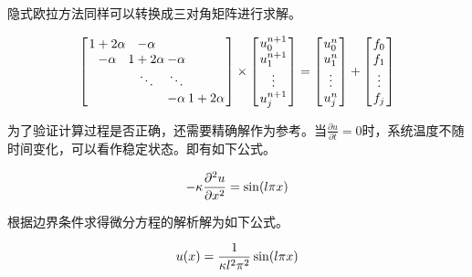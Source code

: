 \documentclass[final]{cvpr}
\begin{document}
隐式欧拉方法同样可以转换成三对角矩阵进行求解。
\begin{center}
	\begin{scriptsize}
		\begin{equation}
			\setlength{\arraycolsep}{1pt}
			\setlength{\abovedisplayskip}{-5pt}
\left[\begin{array}{cccc}
	1+2 \alpha & -\alpha & &  \\
	-\alpha & 1+2 \alpha & -\alpha &  \\
	& \ddots & \ddots & \\
	&  & -\alpha & 1+2\alpha
\end{array}\right] \times\left[\begin{array}{c}
	u_{0}^{n+1} \\
	u_{1}^{n+1} \\
	\vdots \\
	u_{j}^{n+1}
\end{array}\right]=\left[\begin{array}{c}
	u_{0}^{n} \\
	u_{1}^{n} \\
	\vdots \\
	u_{j}^{n}
\end{array}\right]+\left[\begin{array}{c}
	f_{0} \\
	f_{1} \\
	\vdots \\
	f_{j}
\end{array}\right]
		\end{equation}
	\end{scriptsize}
\end{center}

为了验证计算过程是否正确，还需要精确解作为参考。当$\frac{\partial u}{\partial t}=0$时，系统温度不随时间变化，可以看作稳定状态。即有如下公式。
\begin{center}
	\begin{scriptsize}
		\begin{equation}
			\setlength{\abovedisplayskip}{-5pt}
-\kappa \frac{\partial^{2} u}{\partial x^{2}}=\sin (l \pi x)
		\end{equation}
	\end{scriptsize}
\end{center}

根据边界条件求得微分方程的解析解为如下公式。
\begin{center}
	\begin{scriptsize}
		\begin{equation}
			\setlength{\abovedisplayskip}{-5pt}
			u(x)=\frac{1}{\kappa l^{2} \pi^{2}} \sin (l \pi x)
		\end{equation}
	\end{scriptsize}
\end{center}
\end{document}
